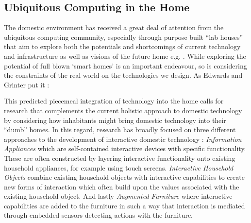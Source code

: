 \subsection{Ubiquitous Computing in the Home}
The domestic environment has received a great deal of attention from the ubiquitous computing community, especially through purpose built “lab houses” that aim to explore both the potentials and shortcomings of current technology and infrastructure as well as visions of the future home e.g. \cite{kidd1999aware}. While exploring the potential of full blown ‘smart homes’ is an important endeavour, so is considering the constraints of the real world on the technologies we design. As Edwards and Grinter put it \cite{edwards2001home}:


This predicted piecemeal integration of technology into the home calls for research that complements the current holistic approach to domestic technology by considering how inhabitants might bring domestic technology into their “dumb” homes. In this regard, research has broadly focused on three different approaches to the development of interactive domestic technology \cite{rodden2003evolution}: \emph{Information Appliances} which are self-contained interactive devices with specific functionality. These are often constructed by layering interactive functionality onto existing household appliances, for example using touch screens. \emph{Interactive Household Objects} combine existing household objects with interactive capabilities to create new forms of interaction which often build upon the values associated with the existing household object. And lastly \emph{Augmented Furniture} where interactive capabilities are added to the furniture in such a way that interaction is mediated through embedded sensors detecting actions with the furniture.

